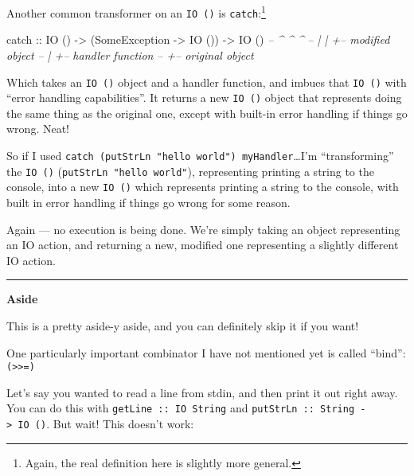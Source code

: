 \documentclass[]{article}
\newenvironment{Shaded}{\begin{snugshade}}{\end{snugshade}}
\newcommand{\CommentTok}[1]{\textcolor[rgb]{0.56,0.35,0.01}{\textit{#1}}}
\newcommand{\DataTypeTok}[1]{\textcolor[rgb]{0.13,0.29,0.53}{#1}}
\newcommand{\NormalTok}[1]{#1}
\newcommand{\OtherTok}[1]{\textcolor[rgb]{0.56,0.35,0.01}{#1}}
\begin{document}
Another common transformer on an \texttt{IO\ ()} is \texttt{catch}:\footnote{Again,
  the real definition here is slightly more general.}

\begin{Shaded}
\begin{Highlighting}[]
\NormalTok{catch}\OtherTok{ ::} \DataTypeTok{IO}\NormalTok{ () }\OtherTok{->}\NormalTok{ (}\DataTypeTok{SomeException} \OtherTok{->} \DataTypeTok{IO}\NormalTok{ ()) }\OtherTok{->} \DataTypeTok{IO}\NormalTok{ ()}
\CommentTok{--       ^         ^                          ^}
\CommentTok{--       |         |                          +-- modified object}
\CommentTok{--       |         +-- handler function}
\CommentTok{--       +-- original object}
\end{Highlighting}
\end{Shaded}

Which takes an \texttt{IO\ ()} object and a handler function, and imbues that
\texttt{IO\ ()} with ``error handling capabilities''. It returns a new
\texttt{IO\ ()} object that represents doing the same thing as the original one,
except with built-in error handling if things go wrong. Neat!

So if I used \texttt{catch\ (putStrLn\ "hello\ world")\ myHandler}\ldots{}I'm
``transforming'' the \texttt{IO\ ()} (\texttt{putStrLn\ "hello\ world"}),
representing printing a string to the console, into a new \texttt{IO\ ()} which
represents printing a string to the console, with built in error handling if
things go wrong for some reason.

Again --- no execution is being done. We're simply taking an object representing
an IO action, and returning a new, modified one representing a slightly
different IO action.

\begin{center}\rule{0.5\linewidth}{\linethickness}\end{center}

\textbf{Aside}

This is a pretty aside-y aside, and you can definitely skip it if you want!

One particularly important combinator I have not mentioned yet is called
``bind'': \texttt{(\textgreater{}\textgreater{}=)}

Let's say you wanted to read a line from stdin, and then print it out right
away. You can do this with \texttt{getLine\ ::\ IO\ String} and
\texttt{putStrLn\ ::\ String\ -\textgreater{}\ IO\ ()}. But wait! This doesn't
work:
\end{document}
